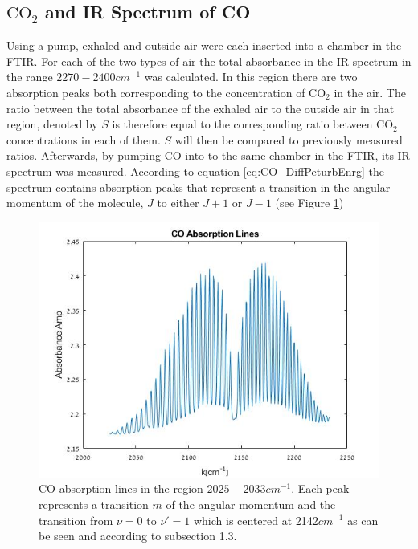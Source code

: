 \documentclass[reprint,amsmath,amssymb,aps, prl,superscriptaddress]{revtex4-2}
\begin{document}
\subsection{$\text{CO}_{2}$ and IR Spectrum of CO}
Using a pump, exhaled and outside air were each inserted into a chamber in the FTIR. For each of the two types of air the total absorbance in the IR spectrum in the range $2270-2400cm^{-1}$ was
calculated. In this region there are two absorption peaks both corresponding to the concentration of $\text{CO}_{2}$ in the air. The ratio between the total absorbance of the exhaled air to the outside air in that region, denoted by $S$ is therefore equal to the corresponding ratio between $\text{CO}_{2}$ concentrations in each of them. $S$ will then be compared to previously measured ratios. 
Afterwards, by pumping CO into to the same chamber in the FTIR, its IR spectrum was measured.
According to equation \ref{eq:CO_DiffPeturbEnrg}
the spectrum contains absorption peaks that represent a transition in the angular momentum of the molecule, $J$  to either $J+1$ or $J-1$ (see Figure \ref{fig:CoEnergy})
\begin{figure}[H]
    \includegraphics[width=\linewidth]{Images/COEnergystates.jpg}
    \caption{CO absorption lines in the region $2025-2033 cm^{-1}$. Each peak represents a transition $m$ of the angular momentum and the transition from $\nu=0$ to $\nu'=1$ which is centered at 2142$cm^{-1}$  as can be seen and according to subsection 1.3.
    }
    \label{fig:CoEnergy}
    \centering
\end{figure}
\end{document}

